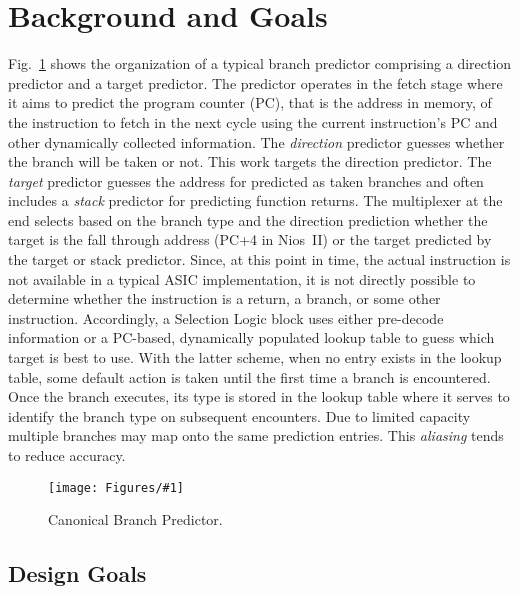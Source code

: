 \documentclass[conference]{IEEEtran}
\newcommand{\kfig}[4]{ %
        \begin{figure}[!t]
        \centering
        \texttt{[image: Figures/\#1]}
        \vspace{-1mm}
        \caption{#3}
        \label{#2}
        \end{figure}
}
\begin{document}
\section{Background and Goals}
\label{sec:background}


Fig.~\ref{fig:bpcanonical} shows the organization of a typical branch predictor comprising a direction predictor and a target predictor.  The predictor operates in the fetch stage where it aims to predict the program counter (PC), that is the address in memory, of the instruction to fetch in the next cycle using the current instruction's PC and other dynamically collected information. The \textit{direction} predictor guesses whether the branch will be taken or not. This work targets the direction predictor. The \textit{target} predictor guesses the address for predicted as taken branches and often includes a \textit{stack} predictor for predicting function returns. The multiplexer at the end selects based on the branch type and the direction prediction whether the target is the fall through address (PC+4 in Nios~II) or the target predicted by the target or stack predictor. Since, at this point in time, the actual instruction is not available in a typical ASIC implementation, it is not directly possible to determine whether the instruction is a return, a branch, or some other instruction. Accordingly, a Selection Logic block uses either pre-decode information or a PC-based, dynamically populated lookup table to guess which target is best to use. With the latter scheme, when no entry exists in the lookup table, some default action is taken until the first time a branch is encountered. Once the branch executes, its type is stored in the lookup table where it serves to identify the branch type on subsequent encounters. Due to limited capacity multiple branches may map onto the same prediction entries. This \textit{aliasing} tends to reduce accuracy. 
\kfig{bpcanonical.pdf}{fig:bpcanonical}{Canonical Branch Predictor.}{angle = 0, trim = 0.2in 1.7in 0.4in 0.6in, clip, width=0.3\textwidth}

\subsection{Design Goals}
\label{sec:background:goal}
\end{document}
